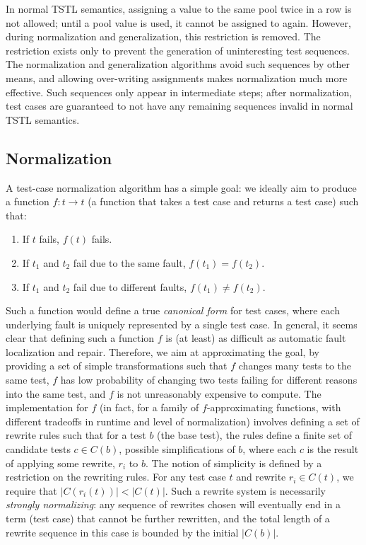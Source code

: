 In normal TSTL semantics, assigning a
value to the same pool twice in a row is not allowed; until a pool
value is used, it cannot be assigned to again.  However, during
normalization and generalization, this restriction is removed.  The
restriction exists only to prevent the generation of uninteresting
test sequences.  The normalization and generalization algorithms avoid
such sequences by other means, and allowing over-writing assignments
makes normalization much more effective.  Such sequences only appear
in intermediate steps; after normalization, test
cases are guaranteed to not have any remaining sequences invalid in
normal TSTL semantics.

\subsection{Normalization}

A test-case normalization algorithm has a simple goal:  we ideally aim to
produce a function $f : t \rightarrow t$ (a function that takes a test
case and returns a test case) such that:

\begin{enumerate}
\item If $t$ fails, $f(t)$ fails.
\item If $t_1$ and $t_2$ fail due to the same fault, $f(t_1) = f(t_2)$.
\item If $t_1$ and $t_2$ fail due to different faults, $f(t_1) \not=
  f(t_2)$.
\end{enumerate}

Such a function would define a true \emph{canonical form} for test
cases, where each underlying fault is uniquely represented by a single
test case.  In general, it seems clear that defining such a function
$f$ is (at least) as difficult as automatic fault localization and
repair.  Therefore, we aim at approximating the goal, by providing a
set of simple transformations such that $f$ changes many tests to the
same test, $f$ has low probability of changing two tests failing for
different reasons into the same test, and $f$ is not unreasonably
expensive to compute.  The implementation for $f$ (in fact, for a
family of $f$-approximating functions, with different tradeoffs in
runtime and level of normalization) involves defining a set of rewrite
rules such that for a test $b$ (the base test), the rules define a
finite set of candidate tests $c \in C(b)$, possible simplifications
of $b$, where each $c$ is the result of applying some rewrite, $r_i$
to $b$.  The notion of simplicity is defined by a restriction on the
rewriting rules.  For any test case $t$ and rewrite $r_i \in C(t)$, we
require that $|C(r_i(t))| < |C(t)|$.  Such a rewrite system is
necessarily \emph{strongly normalizing}: any sequence of rewrites
chosen will eventually end in a term (test case) that cannot be
further rewritten, and the total length of a rewrite sequence in this
case is bounded by the initial $|C(b)|$.

